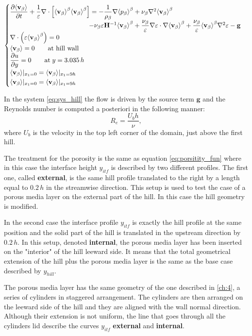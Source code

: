 \begin{eqnarray}
\begin{cases}
\dfrac{\partial {\left< \textbf{v}_{\beta} \right>}}{\partial t} + \dfrac{1}{\varepsilon} \nabla \cdot \left[  {\left< \textbf{v}_{\beta} \right>}^{\beta}  {\left< \textbf{v}_{\beta} \right>}^{\beta} \right] = -\dfrac{1}{\rho_{\beta}} \nabla {\left< p_{\beta}\right>}^{\beta} + \nu_{\beta} \nabla^2 {\left< \textbf{v}_{\beta} \right>}^{\beta} \\ 
\qquad \qquad \qquad \qquad \qquad \qquad- \nu_{\beta} \varepsilon \mathbf{H}^{-1} {\left< \textbf{v}_{\beta} \right>}^{\beta} +\dfrac{\nu_{\beta}}{\varepsilon} \nabla \varepsilon \cdot \nabla {\left< \textbf{v}_{\beta} \right>}^{\beta} + \dfrac{\nu_{\beta}}{\varepsilon} {\left< \textbf{v}_{\beta} \right>}^{\beta} \nabla^2 \varepsilon - \mathbf{g}\\
\nabla \cdot \left(\varepsilon {\left< \textbf{v}_{\beta} \right>}^{\beta} \right) = 0\\
{\left< \textbf{v}_{\beta} \right>} = 0 \qquad \textrm{at hill wall} \\
\dfrac{\partial u}{\partial y}=0 \qquad \textrm{at} \; y = 3.035\,h\\
{\left< \textbf{v}_{\beta} \right>}|_{x_1 = 0} = {\left< \textbf{v}_{\beta} \right>}|_{x_1 = 9h} \\
{\left< \textbf{v}_{\beta} \right>}|_{x_1 = 0} = {\left< \textbf{v}_{\beta} \right>}|_{x_1 = 9h} 
\end{cases}
\label{eq:sys_hill}
\end{eqnarray}

In the system \eqref{eq:sys_hill} the flow is driven by the source term $\mathbf{g}$ and the Reynolds number is computed a posteriori in the following manner:
$$
R_e = \dfrac{U_b h}{\nu},
$$
where $U_b$ is the velocity in the top left corner of the domain, just above the first hill.

The treatment for the porosity is the same as equation \eqref{eq:porsitity_fun} where in this case the interface height $y_{itf}$ is described by two different profiles.
The first one, called \textbf{external}, is the same hill profile translated to the right by a length equal to $0.2\,h$ in the streamwise direction. This setup is used to test the case of a porous media layer on the external part of the hill. In this case the hill geometry is modified.

In the second case the interface profile $y_{itf}$ is exactly the hill profile at the same position and the solid part of the hill is translated in the upstream direction by $0.2\,h$. In this setup, denoted \textbf{internal}, the porous media layer has been inserted on the "interior" of the hill leeward side. It means that the total geometrical extension of the hill plus the porous media layer is the same as the base case described by $y_{hill}$.

The porous media layer has the same geometry of the one described in \ref{ch:4}, a series of cylinders in staggered arrangement. The cylinders are then arranged on the leeward side of the hill and they are aligned with the wall normal direction. Although their extension is not uniform, the line that goes through all the cylinders lid describe the curves $y_{itf}$ \textbf{external} and \textbf{internal}.

